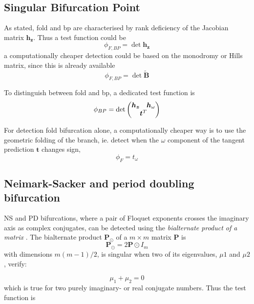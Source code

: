 \subsection{Singular Bifurcation Point}

As stated, fold and \gls{bp} are characterised by rank deficiency of the
Jacobian matrix $\bm h_{\bm z}$. Thus a test function could be
\begin{equation}
  \phi_{F,BP} = \det{\bm h_{\bm z}}
\end{equation}
a computationally cheaper detection could be based on the monodromy or Hills
matrix, since this is already available
\begin{equation}
  \phi_{F,BP} = \det{\tilde{\bm B}}
\end{equation}

To distinguish between fold and \gls{bp}, a dedicated test function is
\begin{equation}
  \phi_{BP} = \det
    \begin{pmatrix}
      \bm h_{\bm z} & \bm h_{\omega} \\
      \multicolumn{2}{c}{\bm t^T}
    \end{pmatrix}
\end{equation}

For detection fold bifurcation alone, a computationally cheaper way is to use
the geometric folding of the branch, ie. detect when the $\omega$ component of
the tangent prediction $\bm t$ changes sign,
\begin{equation}
  \phi_{F} = t_\omega
\end{equation}

\subsection{Neimark-Sacker and period doubling bifurcation}

NS and PD bifurcations, where a pair of Floquet exponents crosses the imaginary
axis as complex conjugates, can be detected using the \textit{bialternate
  product of a matrix} \autocite{kuznetsov2013a}. The bialternate product $\bm
P_\odot $ of a $m \times m$ matrix $\bm P$ is
\begin{equation}
  \bm P_\odot = 2\bm P \odot I_m
\end{equation}
with dimensions $m(m-1)/2$, is singular when two of its eigenvalues, $\mu 1$ and
$\mu 2$, verify:

\begin{equation}
  \mu_1 + \mu_2 = 0
\end{equation}
which is true for two purely imaginary- or real conjugate numbers. Thus the test
function is

